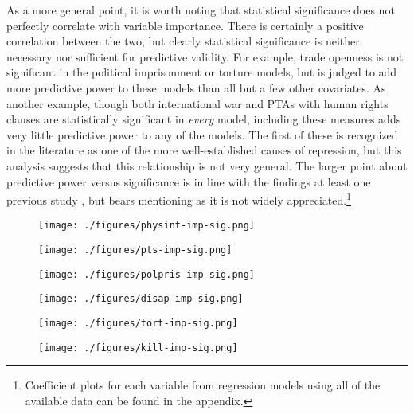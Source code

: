 \documentclass[12pt]{article}
\begin{document}
As a more general point, it is worth noting that statistical significance does not perfectly correlate with variable importance. There is certainly a positive correlation between the two, but clearly statistical significance is neither necessary nor sufficient for predictive validity. For example, trade openness is not significant in the political imprisonment or torture models, but is judged to add more predictive power to these models than all but a few other covariates. As another example, though both international war and PTAs with human rights clauses are statistically significant in {\em every} model, including these measures adds very little predictive power to any of the models. The first of these is recognized in the literature as one of the more well-established causes of repression, but this analysis suggests that this relationship is not very general. The larger point about predictive power versus significance is in line with the findings at least one previous study \citep{Wardetal2010}, but bears mentioning as it is not widely appreciated.\footnote{Coefficient plots for each variable from regression models using all of the available data can be found in the appendix.} 

\begin{figure}[!htpb]
\centering
\texttt{[image: ./figures/physint-imp-sig.png]}
\caption{}
\label{fig:physint-imp}
\end{figure}

\begin{figure}[!htpb]
\centering
\texttt{[image: ./figures/pts-imp-sig.png]}
\caption{}
\label{fig:pts-imp}
\end{figure}

\begin{figure}[!htpb]
\centering
\texttt{[image: ./figures/polpris-imp-sig.png]}
\caption{}
\label{fig:polpris-imp}
\end{figure}

\begin{figure}[!htpb]
\centering
\texttt{[image: ./figures/disap-imp-sig.png]}
\caption{}
\label{fig:disap-imp}
\end{figure}

\begin{figure}[!htpb]
\centering
\texttt{[image: ./figures/tort-imp-sig.png]}
\caption{}
\label{fig:tort-imp}
\end{figure}

\begin{figure}[!htpb]
\centering
\texttt{[image: ./figures/kill-imp-sig.png]}
\caption{}
\label{fig:kill-imp}
\end{figure}
\end{document}
